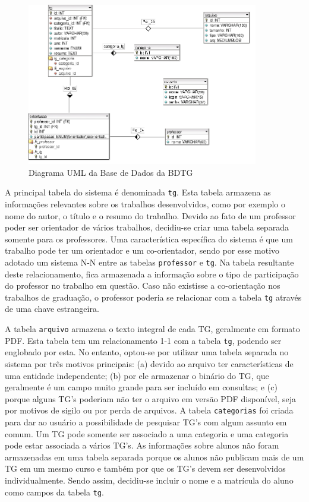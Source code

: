 \documentclass[12pt]{article}
\begin{document}
\begin{figure}[ht]
\centering
\includegraphics [width = 0.9\textwidth]
{img/diagrama.png}
\caption{Diagrama UML da Base de Dados da BDTG}
\label{f:diagrama-uml}
\end{figure}

A principal tabela do sistema \'{e} denominada \texttt{tg}. Esta tabela armazena as informa\c{c}\~{o}es relevantes sobre os trabalhos desenvolvidos, como por exemplo o nome do autor, o t\'{i}tulo e o resumo do trabalho. Devido ao fato de um professor poder ser orientador de v\'{a}rios trabalhos, decidiu-se criar uma tabela separada somente para os professores. Uma caracter\'{i}stica espec\'{i}fica do sistema \'{e} que um trabalho pode ter um orientador e um co-orientador, sendo por esse motivo adotado um sistema N-N entre as tabelas \texttt{professor} e \texttt{tg}. Na tabela resultante deste relacionamento, fica armazenada a informa\c{c}\~{a}o sobre o tipo de participa\c{c}\~{a}o do professor no trabalho em quest\~{a}o. Caso n\~{a}o existisse a co-orienta\c{c}\~{a}o nos trabalhos de gradua\c{c}\~{a}o, o professor poderia se relacionar com a tabela \texttt{tg} atrav\'{e}s de uma chave estrangeira.

A tabela \texttt{arquivo} armazena o texto integral de cada TG, geralmente em formato PDF. Esta tabela tem um relacionamento 1-1 com a tabela \texttt{tg}, podendo ser englobado por esta. No entanto, optou-se por utilizar uma tabela separada no sistema por tr\^{e}s motivos principais: (a) devido ao arquivo ter caracter\'{i}sticas de uma entidade independente; (b) por ele armazenar o bin\'{a}rio do TG, que geralmente \'{e} um campo muito grande para ser inclu\'{i}do em consultas; e (c) porque alguns TG's poderiam n\~{a}o ter o arquivo em vers\~{a}o PDF dispon\'{i}vel, seja por motivos de sigilo ou por perda de arquivos. A tabela \texttt{categorias} foi criada para dar ao usu\'{a}rio a possibilidade de pesquisar TG's com algum assunto em comum. Um TG pode somente ser associado a uma categoria e uma categoria pode estar associada a v\'{a}rios TG's. As informa\c{c}\~{o}es sobre alunos n\~{a}o foram armazenadas em uma tabela separada porque os alunos n\~{a}o publicam mais de um TG em um mesmo curso e tamb\'{e}m por que os TG's devem ser desenvolvidos individualmente. Sendo assim, decidiu-se incluir o nome e a matr\'{i}cula do aluno como campos da tabela \texttt{tg}.
\end{document}
